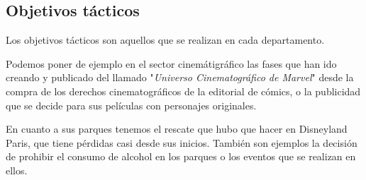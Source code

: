 \subsection{Objetivos tácticos}
Los objetivos tácticos son aquellos que se realizan en cada departamento.

Podemos poner de ejemplo en el sector cinemátigráfico las fases que han ido creando y publicado del llamado "\textit{Universo Cinematográfico de Marvel}" desde la compra de los derechos cinematográficos de la editorial de cómics, o la publicidad que se decide para sus películas con personajes originales.

En cuanto a sus parques tenemos el rescate que hubo que hacer en Disneyland Paris, que tiene pérdidas casi desde sus inicios. También son ejemplos la decisión de prohibir el consumo de alcohol en los parques o los eventos que se realizan en ellos.